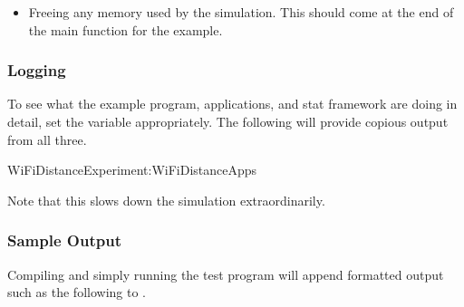 \documentclass[letterpaper,10pt,english]{sphinxmanual}
\renewcommand{\sphinxcode}[1]{\texttt{\small{#1}}}
\begin{document}
\begin{itemize}
\begin{sphinxVerbatim}[commandchars=\\\{\}]
\end{sphinxVerbatim}

\item {} 
Freeing any memory used by the simulation.  This should come at the end of the main function for the example.

\begin{sphinxVerbatim}[commandchars=\\\{\}]
\end{sphinxVerbatim}

\end{itemize}


\subsubsection{Logging}
\label{\detokenize{statistics:logging}}
To see what the example program, applications, and stat framework are doing in detail, set the \sphinxcode{} variable appropriately.  The following will provide copious output from all three.

\begin{sphinxVerbatim}[commandchars=\\\{\}]
\PYGZdl{}  WiFiDistanceExperiment:WiFiDistanceApps
\end{sphinxVerbatim}

Note that this slows down the simulation extraordinarily.


\subsubsection{Sample Output}
\label{\detokenize{statistics:sample-output}}
Compiling and simply running the test program will append  formatted output such as the following to \sphinxcode{}.
\end{document}
